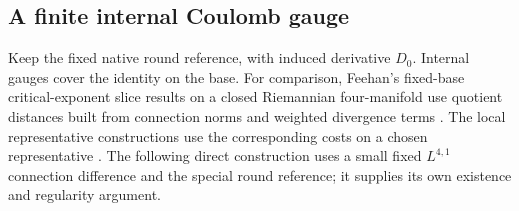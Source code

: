 \documentclass[11pt]{article}
\numberwithin{equation}{section}
\theoremstyle{definition}
\theoremstyle{remark}
\begin{document}
\subsection{A finite internal Coulomb gauge}
\label{subsec:finite-internal-gauge}

Keep the fixed native round reference, with induced derivative \(D_0\).
Internal gauges cover the identity on the base. For comparison,
Feehan's fixed-base critical-exponent slice results on a closed
Riemannian four-manifold use quotient distances built from connection
norms and weighted divergence terms
\cite[Theorems 1.1--1.2]{Feehan2001CriticalSlice}.
The local representative constructions use the corresponding costs
on a chosen representative
\cite[Theorems 8.2 and 8.4]{Feehan2001CriticalSlice}.
The following direct construction uses a small fixed \(L^{4,1}\)
connection difference and the special round reference; it supplies
its own existence and regularity argument.
\end{document}
